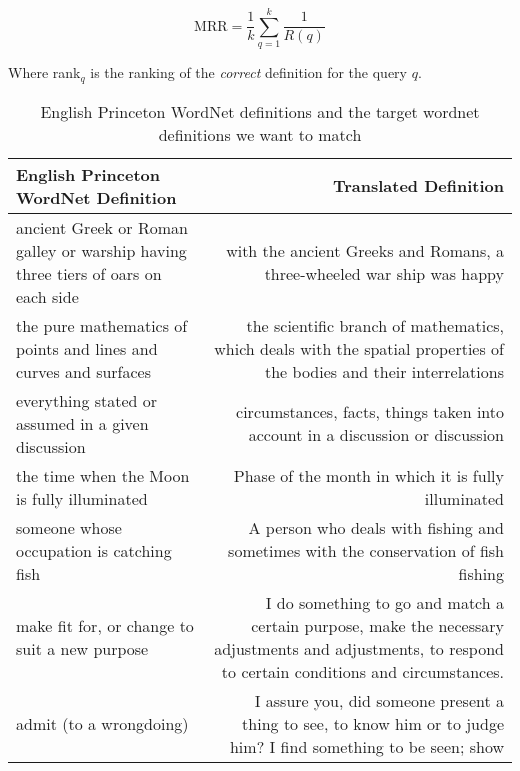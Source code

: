 \begin{equation}
    \text{MRR} = \frac{1}{k} \sum_{q = 1}^{k} \frac{1}{R(q)}
\end{equation}

Where rank$_q$ is the ranking of the \emph{correct} definition for the query $q$.

\begin{table}[htbp]
    \centering
    \begin{tabulary}{\textwidth}{LR}
        \toprule%
        \textbf{English Princeton WordNet Definition} & \textbf{Translated Definition} \\
        \midrule%
        ancient Greek or Roman galley or warship having three tiers of oars on each side & with the ancient Greeks and Romans, a three-wheeled war ship was happy \\
        \cmidrule(rl){1-2}
        the pure mathematics of points and lines and curves and surfaces & the scientific branch of mathematics, which deals with the spatial properties of the bodies and their interrelations \\
        \cmidrule(rl){1-2}
        everything stated or assumed in a given discussion & circumstances, facts, things taken into account in a discussion or discussion \\
        \cmidrule(rl){1-2}
        the time when the Moon is fully illuminated & Phase of the month in which it is fully illuminated \\
        \cmidrule(rl){1-2}
        someone whose occupation is catching fish & A person who deals with fishing and sometimes with the conservation of fish fishing \\
        \cmidrule(rl){1-2}
        make fit for, or change to suit a new purpose & I do something to go and match a certain purpose, make the necessary adjustments and adjustments, to respond to certain conditions and circumstances. \\
        \cmidrule(rl){1-2}
        admit (to a wrongdoing) & I assure you, did someone present a thing to see, to know him or to judge him? I find something to be seen; show \\
        \bottomrule %
    \end{tabulary}%
    \caption{English Princeton WordNet definitions and the target wordnet definitions we want to match}%
    \label{tab:pwn_translated}
\end{table}


